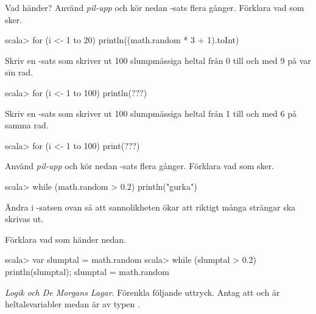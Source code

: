 {{\Subtask Vad händer? Använd \textit{pil-upp} och kör nedan -sats flera gånger. Förklara vad som sker.

\begin{REPLnonum}
scala> for (i <- 1 to 20) println((math.random * 3 + 1).toInt)
\end{REPLnonum}

\Subtask Skriv en -sats som skriver ut 100 slumpmässiga heltal från 0 till och med 9 på var sin rad.

\begin{REPLnonum}
scala> for (i <- 1 to 100) println(???)
\end{REPLnonum}

\Subtask Skriv en -sats som skriver ut 100 slumpmässiga heltal från 1 till och med 6 på samma rad.

\begin{REPLnonum}
scala> for (i <- 1 to 100) print(???)
\end{REPLnonum}


\Subtask Använd \textit{pil-upp} och kör nedan -sats flera gånger. Förklara vad som sker.

\begin{REPLnonum}
scala> while (math.random > 0.2) println("gurka")
\end{REPLnonum}

\Subtask Ändra i -satsen ovan så att sannolikheten ökar att riktigt många strängar ska skrivas ut.

\Subtask Förklara vad som händer nedan.
\begin{REPL}
scala> var slumptal = math.random
scala> while (slumptal > 0.2) { println(slumptal); slumptal = math.random }
\end{REPL}

\Task\Pen \textit{Logik och De Morgans Lagar}. Förenkla följande uttryck. Antag att  och  är heltalsvariabler medan  är av typen .

\Subtask {}

\Subtask {}

\Subtask {}

\Subtask {}

\Subtask {}

\Subtask {}

\Subtask {}


}}
